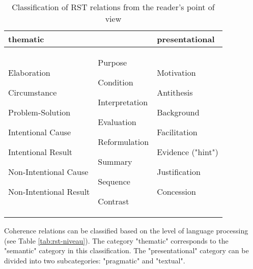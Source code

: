 \documentclass{KBook}
\begin{document}
\begin{table}[ht]
	\centering\small
	\begin{tabular}{p{}p{}p{}}
		\hline\hline
		\textbf{thematic} && \textbf{presentational}\\
		\hline
		
		Elaboration
		
		Circumstance
		
		Problem-Solution
		
		Intentional Cause
		
		Intentional Result
		
		Non-Intentional Cause
		
		Non-Intentional Result
		
		& Purpose
		
		Condition
		
		Interpretation
		
		Evaluation
		
		Reformulation
		
		Summary
		
		Sequence
		
		Contrast
		&
		Motivation
		
		Antithesis
		
		Background
		
		Facilitation
		
		Evidence ("hint")
		
		Justification
		
		Concession\\
		\hline\hline
	\end{tabular}
	\caption[Classification of RST relations from the reader's point of view]{Classification of RST relations from the reader's point of view \cite{2006-Cornish}}
	\label{tab:rst-class-lect}
\end{table}


Coherence relations can be classified based on the level of language processing (see Table \ref{tab:rst-niveau}). The category "thematic" corresponds to the "semantic" category in this classification. The "presentational" category can be divided into two subcategories: "pragmatic" and "textual".
\end{document}
